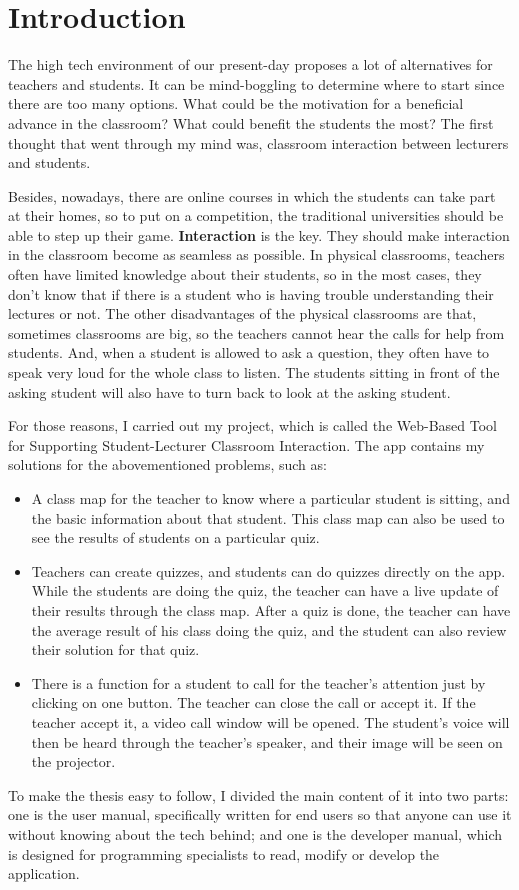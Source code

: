 \documentclass[a4paper, 11pt,openany]{book} %
\begin{document}
\chapter{Introduction}
The high tech environment of our present-day proposes a lot of alternatives for teachers and students. It can be mind-boggling to determine where to start since there are too many options. What could be the motivation for a beneficial advance in the classroom? What could benefit the students the most? The first thought that went through my mind was, classroom interaction between lecturers and students.\par 
Besides, nowadays, there are online courses in which the students can take part at their homes, so to put on a competition, the traditional universities should be able to step up their game. \textbf{Interaction} is the key. They should make interaction in the classroom become as seamless as possible. In physical classrooms, teachers often have limited knowledge about their students, so in the most cases, they don't know that if there is a student who is having trouble understanding their lectures or not. The other disadvantages of the physical classrooms are that, sometimes classrooms are big, so the teachers cannot hear the calls for help from students. And, when a student is allowed to ask a question, they often have to speak very loud for the whole class to listen. The students sitting in front of the asking student will also have to turn back to look at the asking student. \par 
For those reasons, I carried out my project, which is called the Web-Based Tool for Supporting Student-Lecturer Classroom Interaction. The app contains my solutions for the abovementioned problems, such as:
\begin{itemize}
    \item A class map for the teacher to know where a particular student is sitting, and the basic information about that student. This class map can also be used to see the results of students on a particular quiz.
    \item Teachers can create quizzes, and students can do quizzes directly on the app. While the students are doing the quiz, the teacher can have a live update of their results through the class map. After a quiz is done, the teacher can have the average result of his class doing the quiz, and the student can also review their solution for that quiz. 
    \item There is a function for a student to call for the teacher's attention just by clicking on one button. The teacher can close the call or accept it. If the teacher accept it, a video call window will be opened. The student's voice will then be heard through the teacher's speaker, and their image will be seen on the projector.
\end{itemize}
To make the thesis easy to follow, I divided the main content of it into two parts: one is the user manual, specifically written for end users so that anyone can use it without knowing about the tech behind; and one is the developer manual, which is designed for programming specialists to read, modify or develop the application. 
\end{document}
